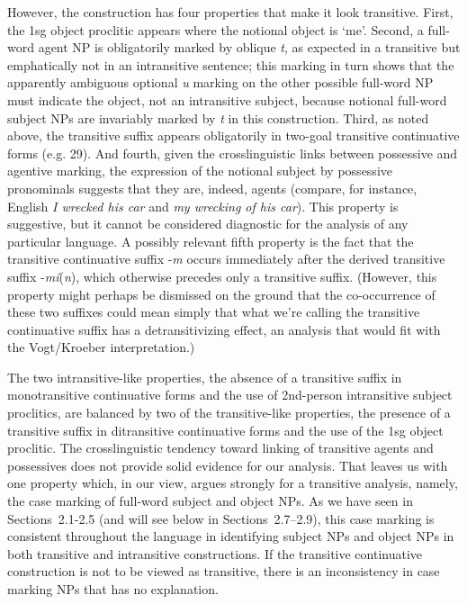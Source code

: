 \documentclass[output=paper,colorlinks,citecolor=brown]{langscibook}
\begin{document}
However, the construction has four properties that make it look
transitive.  First, the 1sg object proclitic appears where the
notional object is `me'.  Second, a full-word agent NP is obligatorily
marked by oblique \emph{t}, as expected in a transitive but
emphatically not in an intransitive sentence; this marking in turn
shows that the apparently ambiguous optional \emph{{\textltilde}u}
marking on the other possible full-word NP must indicate the object,
not an intransitive subject, because notional full-word subject NPs
are invariably marked by \emph{t} in this construction.  Third, as
noted above, the transitive suffix appears obligatorily in two-goal
transitive continuative forms (e.g. 29).  And fourth, given the
crosslinguistic links between possessive and agentive marking, the
expression of the notional subject by possessive pronominals suggests
that they are, indeed, agents (compare, for instance, English \emph{I
wrecked his car} and \emph{my wrecking of his car}).  This property is
suggestive, but it cannot be considered diagnostic for the analysis of
any particular language.  A possibly relevant fifth property is the
fact that the transitive continuative suffix -\emph{m} occurs
immediately after the derived transitive suffix
-\emph{m\'i}(\emph{n}), which otherwise precedes only a transitive
suffix.  (However, this property might perhaps be dismissed on the
ground that the co-occurrence of these two suffixes could mean simply
that what we're calling the transitive continuative suffix has a
detransitivizing effect, an analysis that would fit with the
Vogt/Kroeber interpretation.)


The two intransitive-like properties, the absence of a transitive
suffix in monotransitive continuative forms and the use of 2nd-person
intransitive subject proclitics, are balanced by two of the
transitive-like properties, the presence of a transitive suffix in
ditransitive continuative forms and the use of the 1sg object
proclitic.  The crosslinguistic tendency toward linking of transitive
agents and possessives does not provide solid evidence for our
analysis.  That leaves us with one property which, in our view, argues
strongly for a transitive analysis, namely, the case marking of
full-word subject and object NPs.  As we have seen in Sections~2.1-2.5 (and
will see below in Sections~2.7--2.9), this case marking is consistent
throughout the language in identifying subject NPs and object NPs in
both transitive and intransitive constructions.  If the transitive
continuative construction is not to be viewed as transitive, there is
an inconsistency in case marking NPs that has no explanation.
\end{document}
